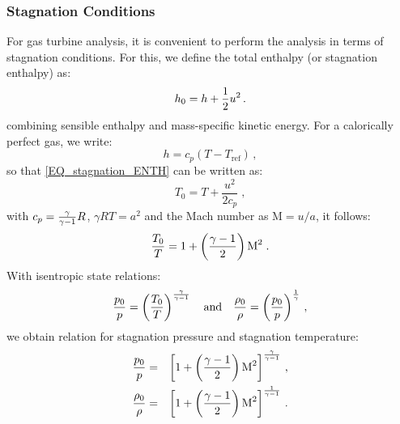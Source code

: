 \subsubsection{Stagnation Conditions}
For gas turbine analysis, it is convenient to perform the analysis in terms of stagnation conditions. For this, we define the total enthalpy (or stagnation enthalpy) as:
\begin{equation}
 \label{EQ_stagnation_ENTH}
  h_0 = h + {\frac{1}{2}} u^2 \,.
\end{equation}
combining sensible enthalpy and mass-specific kinetic energy. For a calorically perfect gas, we write:
\begin{equation}
  h = c_p (T-T_\text{ref})\,,
\end{equation}
so that \cref{EQ_stagnation_ENTH} can be written as:
\begin{equation}
T_0 = T + \frac{u^2}{2c_p}\;,
\end{equation}
with $c_p = {\frac{\gamma}{\gamma-1}}R$, $\gamma R T = a^2$ and the Mach number as $\text{M} = {u}/{a}$, it follows:
\begin{equation}
  {\frac{T_0}{T}} = 1+ \left({\frac{\gamma-1}{2}}\right) \text{M}^2\;.
\end{equation}
With isentropic state relations: 
\begin{equation}
  {\frac{p_0}{p}} = \left({\frac{T_0}{T}}\right)^{\frac{\gamma}{\gamma-1}} \quad \text{and} \quad {\frac{\rho_0}{\rho}} = \left({\frac{p_0}{p}}\right)^{\frac{1}{\gamma}}\,,
\end{equation}
we obtain relation for stagnation pressure and stagnation temperature:
\begin{eqnarray}
  {\frac{p_0}{p}} &=& \left[1+ \left({\frac{\gamma-1}{2}}\right) \text{M}^2\right]^{\frac{\gamma}{\gamma-1}}\,,\\
  {\frac{\rho_0}{\rho}} &=& \left[1+ \left({\frac{\gamma-1}{2}}\right) \text{M}^2\right]^{\frac{1}{\gamma-1}}\,.
\end{eqnarray}





